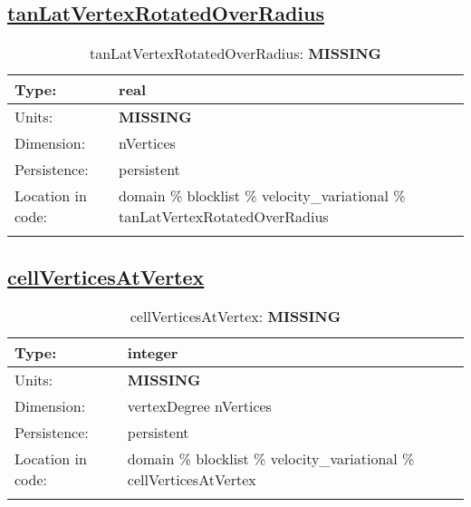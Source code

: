 \subsection[tanLatVertexRotatedOverRadius]{\hyperref[sec:var_tab_velocity_variational]{tanLatVertexRotatedOverRadius}}
\label{subsec:var_sec_velocity_variational_tanLatVertexRotatedOverRadius}
\begin{center}
\begin{longtable}{| p{2.0in} | p{4.0in} |}
        \hline 
        Type: & real \\
        \hline 
        Units: & {\bf \color{red} MISSING} \\
        \hline 
        Dimension: & nVertices \\
        \hline 
        Persistence: & persistent \\
        \hline 
         Location in code: & domain \% blocklist \% velocity\_variational \% tanLatVertexRotatedOverRadius \\
         \hline 
    \caption{tanLatVertexRotatedOverRadius: {\bf \color{red} MISSING}}
\end{longtable}
\end{center}
\subsection[cellVerticesAtVertex]{\hyperref[sec:var_tab_velocity_variational]{cellVerticesAtVertex}}
\label{subsec:var_sec_velocity_variational_cellVerticesAtVertex}
\begin{center}
\begin{longtable}{| p{2.0in} | p{4.0in} |}
        \hline 
        Type: & integer \\
        \hline 
        Units: & {\bf \color{red} MISSING} \\
        \hline 
        Dimension: & vertexDegree nVertices \\
        \hline 
        Persistence: & persistent \\
        \hline 
         Location in code: & domain \% blocklist \% velocity\_variational \% cellVerticesAtVertex \\
         \hline 
    \caption{cellVerticesAtVertex: {\bf \color{red} MISSING}}
\end{longtable}
\end{center}

